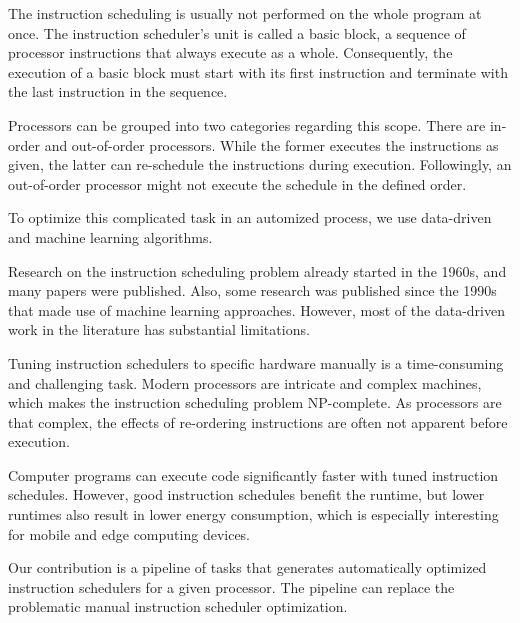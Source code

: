 The instruction scheduling is usually not performed on the whole program at once.
The instruction scheduler's unit is called a basic block, a sequence of processor instructions that always execute as a whole.
Consequently, the execution of a basic block must start with its first instruction and terminate with the last instruction in the sequence.

Processors can be grouped into two categories regarding this scope.
There are in-order and out-of-order processors.
While the former executes the instructions as given, the latter can re-schedule the instructions during execution.
Followingly, an out-of-order processor might not execute the schedule in the defined order.

To optimize this complicated task in an automized process, we use data-driven and machine learning algorithms.

Research on the instruction scheduling problem already started in the 1960s, and many papers were published.
Also, some research was published since the 1990s that made use of machine learning approaches.
However, most of the data-driven work in the literature has substantial limitations.

Tuning instruction schedulers to specific hardware manually is a time-consuming and challenging task.
Modern processors are intricate and complex machines, which makes the instruction scheduling problem NP-complete.
As processors are that complex, the effects of re-ordering instructions are often not apparent before execution.

Computer programs can execute code significantly faster with tuned instruction schedules. 
However, good instruction schedules benefit the runtime, but lower runtimes also result in lower energy consumption, which is especially interesting for mobile and edge computing devices.

Our contribution is a pipeline of tasks that generates automatically optimized instruction schedulers for a given processor.
The pipeline can replace the problematic manual instruction scheduler optimization.


